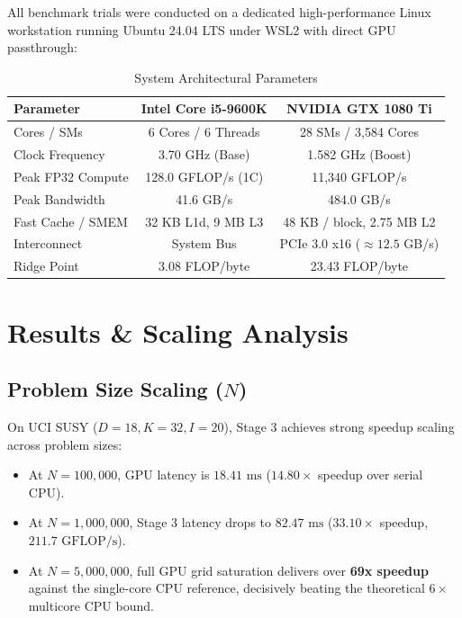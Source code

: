 \documentclass[sigconf,nonacm]{acmart}
\begin{document}
All benchmark trials were conducted on a dedicated high-performance Linux workstation running Ubuntu 24.04 LTS under WSL2 with direct GPU passthrough:

\begin{table}[h]
\centering
\caption{System Architectural Parameters}
\label{tab:hardware}
\begin{tabular}{lcc}
\toprule
\textbf{Parameter} & \textbf{Intel Core i5-9600K} & \textbf{NVIDIA GTX 1080 Ti} \\
\midrule
Cores / SMs & 6 Cores / 6 Threads & 28 SMs / 3,584 Cores \\
Clock Frequency & 3.70 GHz (Base) & 1.582 GHz (Boost) \\
Peak FP32 Compute & 128.0 GFLOP/s (1C) & 11,340 GFLOP/s \\
Peak Bandwidth & 41.6 GB/s & 484.0 GB/s \\
Fast Cache / SMEM & 32 KB L1d, 9 MB L3 & 48 KB / block, 2.75 MB L2 \\
Interconnect & System Bus & PCIe 3.0 x16 ($\approx 12.5$ GB/s) \\
Ridge Point & 3.08 FLOP/byte & 23.43 FLOP/byte \\
\bottomrule
\end{tabular}
\end{table}

\section{Results \& Scaling Analysis}

\subsection{Problem Size Scaling ($N$)}
On UCI SUSY ($D=18, K=32, I=20$), Stage 3 achieves strong speedup scaling across problem sizes:
\begin{itemize}
    \item At $N=100{,}000$, GPU latency is $18.41\text{ ms}$ ($14.80\times$ speedup over serial CPU).
    \item At $N=1{,}000{,}000$, Stage 3 latency drops to $82.47\text{ ms}$ ($33.10\times$ speedup, $211.7\text{ GFLOP/s}$).
    \item At $N=5{,}000{,}000$, full GPU grid saturation delivers over \textbf{69x speedup} against the single-core CPU reference, decisively beating the theoretical $6\times$ multicore CPU bound.
\end{itemize}
\end{document}
